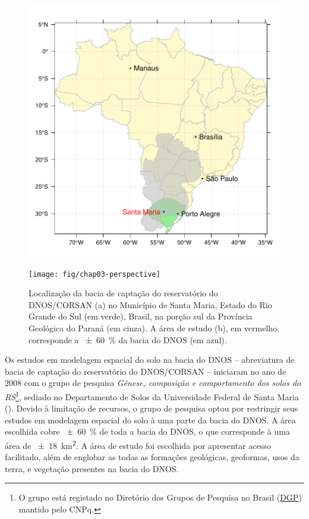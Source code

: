 \begin{figure}[!ht]
\centering
\begin{minipage}[b]{95mm}
\subcaption{}
\includegraphics{fig/chap03-location}
\end{minipage}
\begin{minipage}[b]{95mm}
\subcaption{}
\texttt{[image: fig/chap03-perspective]}
\end{minipage}
\caption{Localização da bacia de captação do reservatório do DNOS/CORSAN (a) no Município de Santa Maria, 
Estado do Rio Grande do Sul (em verde), Brasil, na porção sul da Província Geológica do Paraná (em cinza). A 
área de estudo (b), em vermelho, corresponde a \SI{\pm60}{\percent} da bacia do DNOS (em azul).}
\label{fig:chap03-location}
\end{figure}

\def\footsolosdors{\footnote{O grupo está registado no Diretório dos Grupos de Pesquisa no Brasil 
(\href{http://dgp.cnpq.br/dgp/espelhogrupo/9373361709890764}{DGP}) mantido pelo CNPq.}}

Os estudos em modelagem espacial do solo na bacia do DNOS -- abreviatura de bacia de captação do reservatório 
do DNOS/CORSAN -- iniciaram no ano de \num{2008} com o grupo de pesquisa \emph{Gênese, composição e 
comportamento dos solos do RS}\footsolosdors{}, sediado no Departamento de Solos da Universidade Federal 
de Santa Maria (\ufsm). Devido à limitação de recursos, o grupo de pesquisa optou por restringir seus estudos 
em modelagem espacial do solo à uma parte da bacia do DNOS. A área escolhida cobre \SI{\pm60}{\percent} de 
toda 
a bacia do DNOS, o que corresponde à uma área de \SI{\pm18}{\square\kilo\metre}. A área de estudo foi 
escolhida por apresentar acesso facilitado, além de englobar as todas as formações geológicas, geoformas, usos 
da terra, e vegetação presentes na bacia do DNOS.

